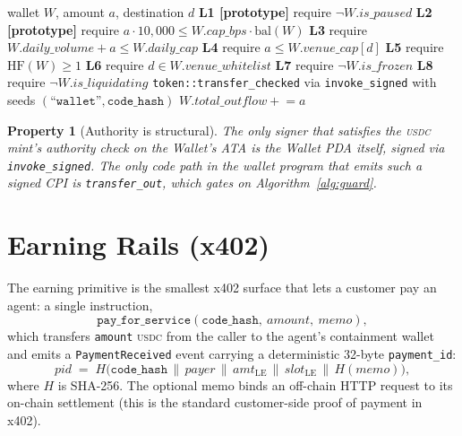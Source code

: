 \documentclass[10pt,conference,letterpaper]{IEEEtran}
\newtheorem{property}[theorem]{Property}
\theoremstyle{definition}
\newcommand{\codehash}{\texttt{code\_hash}}
\newcommand{\USDC}{\textsc{usdc}}
\begin{document}
\begin{algorithm}[t]
\caption{Outbound wallet guard. Layers L1--L2 are enforced in the
prototype; L3--L8 are production-only.}
\label{alg:guard}
\begin{algorithmic}[1]
\Require wallet $W$, amount $a$, destination $d$
\State \textbf{L1 [prototype]} require $\neg W.\mathit{is\_paused}$
\State \textbf{L2 [prototype]} require $a \cdot 10{,}000 \le W.\mathit{cap\_bps} \cdot \mathrm{bal}(W)$
\State \textbf{L3} require $W.\mathit{daily\_volume} + a \le W.\mathit{daily\_cap}$
\State \textbf{L4} require $a \le W.\mathit{venue\_cap}[d]$
\State \textbf{L5} require $\mathrm{HF}(W) \ge 1$
\State \textbf{L6} require $d \in W.\mathit{venue\_whitelist}$
\State \textbf{L7} require $\neg W.\mathit{is\_frozen}$
\State \textbf{L8} require $\neg W.\mathit{is\_liquidating}$
\State \texttt{token::transfer\_checked} via \texttt{invoke\_signed} with seeds
  $(\texttt{``wallet''}, \codehash)$
\State $W.\mathit{total\_outflow} \mathrel{+}= a$
\end{algorithmic}
\end{algorithm}

\begin{property}[Authority is structural]\label{prop:wallet-auth}
The only signer that satisfies the \USDC{} mint's authority check on
the Wallet's ATA is the Wallet PDA itself, signed via
\texttt{invoke\_signed}. The only code path in the wallet program that
emits such a signed CPI is \texttt{transfer\_out}, which gates on
Algorithm~\ref{alg:guard}.
\end{property}

\section{Earning Rails (x402)}\label{sec:earning}

The earning primitive is the smallest x402 surface that lets a customer
pay an agent: a single instruction,
\[
\texttt{pay\_for\_service}(\codehash,\ \mathit{amount},\ \mathit{memo}),
\]
which transfers \texttt{amount} \USDC{} from the caller to the agent's
containment wallet and emits a \texttt{PaymentReceived} event carrying a
deterministic 32-byte \texttt{payment\_id}:
\begin{equation}
\mathit{pid} \;=\; H\bigl(\codehash\,\|\,\mathit{payer}\,\|\,\mathit{amt}_\mathrm{LE}\,\|\,\mathit{slot}_\mathrm{LE}\,\|\,H(\mathit{memo})\bigr),
\label{eq:pid}
\end{equation}
where $H$ is SHA-256. The optional memo binds an off-chain HTTP request
to its on-chain settlement (this is the standard customer-side proof of
payment in x402).
\end{document}
